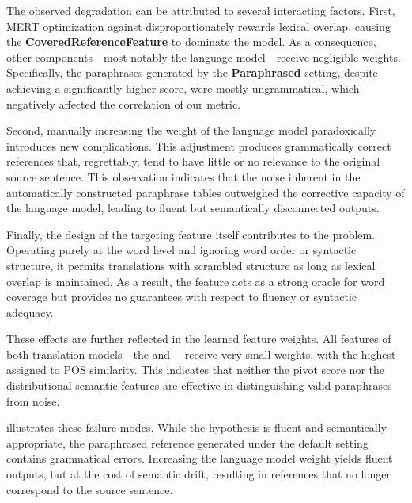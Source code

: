 The observed degradation can be attributed to several interacting factors. First, MERT optimization against \bleu disproportionately rewards lexical overlap, causing the \textbf{CoveredReferenceFeature} to dominate the model. As a consequence, other components—most notably the language model—receive negligible weights. Specifically, the paraphrases generated by the \textbf{Paraphrased} setting, despite achieving a significantly higher \bleu score, were mostly ungrammatical, which negatively affected the correlation of our metric.

Second, manually increasing the weight of the language model paradoxically introduces new complications. This adjustment produces grammatically correct references that, regrettably, tend to have little or no relevance to the original source sentence. This observation indicates that the noise inherent in the automatically constructed paraphrase tables outweighed the corrective capacity of the language model, leading to fluent but semantically disconnected outputs.

Finally, the design of the targeting feature itself contributes to the problem. Operating purely at the word level and ignoring word order or syntactic structure, it permits translations with scrambled structure as long as lexical overlap is maintained. As a result, the feature acts as a strong oracle for word coverage but provides no guarantees with respect to fluency or syntactic adequacy.

These effects are further reflected in the learned feature weights. All features of both translation models---the \owpt and \enhanedmeteor---receive very small weights, with the highest assigned to POS similarity. This indicates that neither the pivot score nor the distributional semantic features are effective in distinguishing valid paraphrases from noise.

 illustrates these failure modes. While the hypothesis is fluent and semantically appropriate, the paraphrased reference generated under the default setting contains grammatical errors. Increasing the language model weight yields fluent outputs, but at the cost of semantic drift, resulting in references that no longer correspond to the source sentence.


